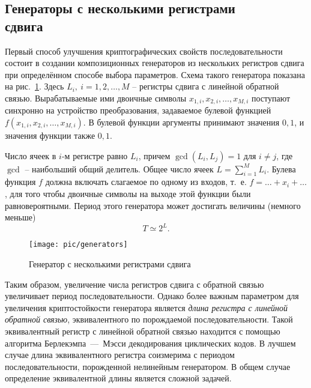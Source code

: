 ﻿\subsection[Генераторы с несколькими регистрами сдвига]{Генераторы с несколькими регистрами \protect\\ сдвига}

Первый способ улучшения криптографических свойств последовательности состоит в создании композиционных генераторов из нескольких регистров сдвига при определённом способе выбора параметров. Схема такого генератора показана на рис.~\ref{fig:generators}. Здесь $L_i, ~ i = 1, 2, \dots, M$ -- регистры сдвига с линейной обратной связью. Вырабатываемые ими двоичные символы $x_{1,i}, x_{2,i},  \dots, x_{M,i}$ поступают синхронно на устройство преобразования, задаваемое булевой функцией $f(x_{1,i}, x_{2,i}, \dots, x_{M,i})$. В булевой функции аргументы принимают значения $0,1$, и значения функции также $0,1$.

Число ячеек в $i$-м регистре равно $L_{i}$, причем $\gcd(L_i, L_j)=1$ для $i \neq j$, где  $\gcd$ -- наибольший общий делитель. Общее число ячеек $L = \sum\limits_{i=1}^M L_i$. Булева функция $f$ должна включать слагаемое по одному из входов, т.~е. $f = \dots + x_i + \dots$, для того чтобы двоичные символы на выходе этой функции были равновероятными. Период этого генератора может достигать величины (немного меньше)
    \[ T \simeq 2^L. \]

\begin{figure}[!ht]
	\centering
	\texttt{[image: pic/generators]}
    \caption{Генератор с несколькими регистрами сдвига\label{fig:generators}}
\end{figure}

Таким образом, увеличение числа регистров сдвига с обратной связью увеличивает период последовательности. Однако более важным параметром для увеличения криптостойкости генератора является \emph{ длина регистра с линейной обратной связью}, эквивалентного по порождаемой последовательности. Такой эквивалентный регистр с линейной обратной связью находится с помощью алгоритма Берлекэмпа~---~Мэсси декодирования циклических кодов. В лучшем случае длина эквивалентного регистра соизмерима с периодом последовательности, порожденной нелинейным генератором. В общем случае определение эквивалентной длины является сложной задачей.

